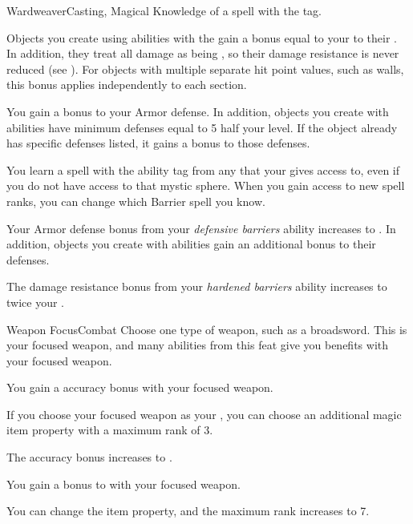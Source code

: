     \begin{magicalfeat}{Wardweaver}{Casting, Magical}
        \featpre Knowledge of a spell with the  tag.

         Objects you create using abilities with the   gain a bonus equal to your  to their .
        In addition, they treat all damage as being , so their damage resistance is never reduced (see ).
        For objects with multiple separate hit point values, such as walls, this bonus applies independently to each section.

         You gain a  bonus to your Armor defense.
        In addition, objects you create with  abilities have minimum defenses equal to 5 \add half your level.
        If the object already has specific defenses listed, it gains a  bonus to those defenses.

         You learn a spell with the  ability tag from any  that your  gives access to, even if you do not have access to that mystic sphere.
        When you gain access to new spell ranks, you can change which Barrier spell you know.

         Your Armor defense bonus from your \textit{defensive barriers} ability increases to .
        In addition, objects you create with  abilities gain an additional  bonus to their defenses.

         The damage resistance bonus from your \textit{hardened barriers} ability increases to twice your .
    \end{magicalfeat}

    \begin{feat}{Weapon Focus}{Combat}
         Choose one type of weapon, such as a broadsword.
        This is your focused weapon, and many abilities from this feat give you benefits with your focused weapon.

         You gain a  accuracy bonus with your focused weapon.

         If you choose your focused weapon as your , you can choose an additional magic item property with a maximum rank of 3.

         The accuracy bonus increases to .

         You gain a  bonus to  with your focused weapon.

         You can change the item property, and the maximum rank increases to 7.
    \end{feat}


